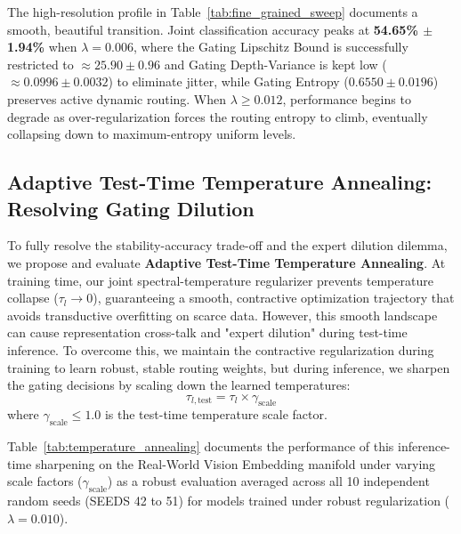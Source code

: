 The high-resolution profile in Table~\ref{tab:fine_grained_sweep} documents a smooth, beautiful transition. Joint classification accuracy peaks at \textbf{54.65\% $\pm$ 1.94\%} when $\lambda = 0.006$, where the Gating Lipschitz Bound is successfully restricted to $\approx 25.90 \pm 0.96$ and Gating Depth-Variance is kept low ($\approx 0.0996 \pm 0.0032$) to eliminate jitter, while Gating Entropy ($0.6550 \pm 0.0196$) preserves active dynamic routing. When $\lambda \ge 0.012$, performance begins to degrade as over-regularization forces the routing entropy to climb, eventually collapsing down to maximum-entropy uniform levels.

\subsection{Adaptive Test-Time Temperature Annealing: Resolving Gating Dilution}
To fully resolve the stability-accuracy trade-off and the expert dilution dilemma, we propose and evaluate \textbf{Adaptive Test-Time Temperature Annealing}. At training time, our joint spectral-temperature regularizer prevents temperature collapse ($\tau_l \to 0$), guaranteeing a smooth, contractive optimization trajectory that avoids transductive overfitting on scarce data. However, this smooth landscape can cause representation cross-talk and "expert dilution" during test-time inference. To overcome this, we maintain the contractive regularization during training to learn robust, stable routing weights, but during inference, we sharpen the gating decisions by scaling down the learned temperatures:
\begin{equation}
\tau_{l, \text{test}} = \tau_l \times \gamma_{\text{scale}}
\end{equation}
where $\gamma_{\text{scale}} \le 1.0$ is the test-time temperature scale factor.

Table~\ref{tab:temperature_annealing} documents the performance of this inference-time sharpening on the Real-World Vision Embedding manifold under varying scale factors ($\gamma_{\text{scale}}$) as a robust evaluation averaged across all 10 independent random seeds (SEEDS 42 to 51) for models trained under robust regularization ($\lambda=0.010$).

